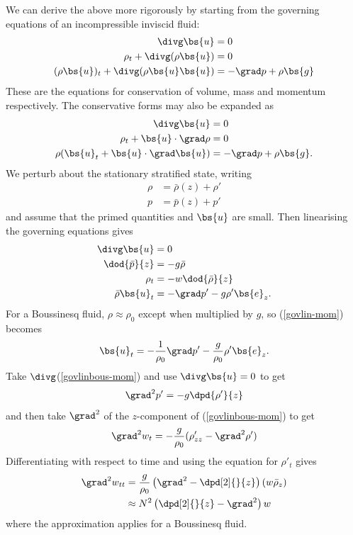 We can derive the above more rigorously by starting from the governing equations of an incompressible inviscid fluid:
\begin{align}
	\divg\bs{u} &= 0\\
	\rho_t + \divg(\rho\bs{u}) &= 0\\
	(\rho\bs{u})_t +\divg(\rho\bs{u}\bs{u}) &= -\grad p + \rho\bs{g} 
\end{align}
These are the equations for conservation of volume, mass and momentum respectively. The conservative forms may also be expanded as 
\begin{align}
	\divg\bs{u} &= 0\\
	\rho_t + \bs{u}\cdot\grad\rho &= 0\\
	\rho (\bs{u}_t +\bs{u}\cdot\grad\bs{u}) &= -\grad p + \rho\bs{g}.
\end{align}
We perturb about the stationary stratified state, writing
\begin{align}
	\rho &= \bar{\rho}(z) + \rho' \\
	p &= \bar{p}(z) + p' 
\end{align}
and assume that the primed quantities and $\bs{u}$ are small. Then linearising the governing equations gives
\begin{align}
	\divg\bs{u} &= 0\\
	\dod{\bar{p}}{z} &= -g\bar{\rho} \\
	\rho_t &= -w\dod{\bar{\rho}}{z} \\
	\bar{\rho} \bs{u}_t &= -\grad p' - g\rho'\bs{e}_z. \label{govlin-mom}
\end{align}
For a Boussinesq fluid, $\rho\approx\rho_0$ except when multiplied by $g$, so (\ref{govlin-mom}) becomes
\begin{align}
	\bs{u}_t = -\frac{1}{\rho_0}\grad p' - \frac{g}{\rho_0} \rho' \bs{e}_z. \label{govlinbous-mom}
\end{align}
Take $\divg$(\ref{govlinbous-mom}) and use $\divg\bs{u} = 0$ to get
\begin{equation}
	\grad^2p' = -g\dpd{\rho'}{z}
\end{equation}
and then take $\grad^2$ of the $z$-component of (\ref{govlinbous-mom}) to get 
\begin{equation}
	\grad^2 w_t = -\frac{g}{\rho_0} (\rho'_{zz} - \grad^2 \rho')
\end{equation}
Differentiating with respect to time and using the equation for $\rho'_t$ gives
\begin{align}
	\grad^2w_{tt} &= \frac{g}{\rho_0} \left(\grad^2 - \dpd[2]{}{z}\right) (w\bar{\rho}_z) \\
			&\approx N^2 \left(\dpd[2]{}{z} - \grad^2\right) w
			\label{igw-govlin-w}
\end{align}
where the approximation applies for a Boussinesq fluid.

